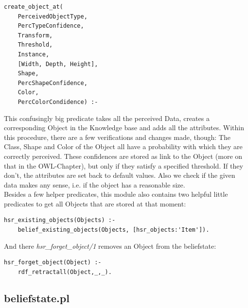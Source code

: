 \documentclass[main.tex]{subfiles}
\begin{document}
\begin{lstlisting}
create_object_at(
	PerceivedObjectType, 
	PercTypeConfidence, 
	Transform, 
	Threshold, 
	Instance, 
	[Width, Depth, Height], 
	Shape, 
	PercShapeConfidence, 
	Color, 
	PercColorCondidence) :-
\end{lstlisting}
This confusingly big predicate takes all the perceived Data, creates a corresponding Object in the Knowledge base and adds all the attributes. Within this procedure, there are a few verifications and changes made, though: The Class, Shape and Color of the Object all have a probability with which they are correctly perceived. These confidences are stored as link to the Object (more on that in the OWL-Chapter), but only if they satisfy a specified threshold. If they don't, the attributes are set back to default values. Also we check if the given data makes any sense, i.e. if the object has a reasonable size.\\
Besides a few helper predicates, this module also contains two helpful little predicates to get all Objects that are stored at that moment:
\begin{lstlisting}
hsr_existing_objects(Objects) :-
    belief_existing_objects(Objects, [hsr_objects:'Item']).
\end{lstlisting}
And there \textit{hsr\_forget\_object/1} removes an Object from the beliefstate:
\begin{lstlisting}
hsr_forget_object(Object) :-
    rdf_retractall(Object,_,_).
\end{lstlisting}

\subsection{beliefstate.pl}
\end{document}

